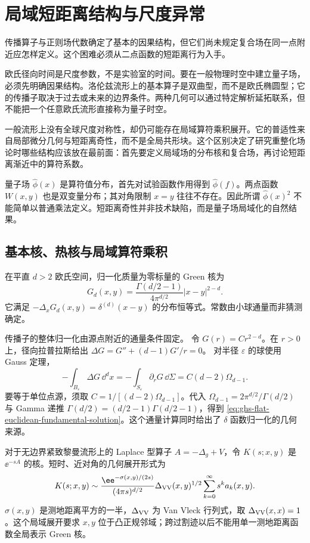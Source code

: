 \section{局域短距离结构与尺度异常}

传播算子与正则场代数确定了基本的因果结构，但它们尚未规定复合场在同一点附近应怎样定义。这个困难必须从二点函数的短距离行为入手。


欧氏径向时间是尺度参数，不是实验室的时间。要在一般物理时空中建立量子场，必须先明确因果结构。洛伦兹流形上的基本算子是双曲型，而不是欧氏椭圆型；它的传播子取决于过去或未来的边界条件。两种几何可以通过特定解析延拓联系，但不能把一个任意欧氏流形直接称为量子时空。


一般流形上没有全球尺度对称性，却仍可能存在局域算符乘积展开。它的普适性来自局部微分几何与短距离奇性，而不是全局共形块。这个区别决定了研究重整化场论时哪些结构应该放在最前面：首先要定义局域场的分布核和复合场，再讨论短距离渐近中的算符系数。


量子场 $\widehat\phi(x)$ 是算符值分布，首先对试验函数作用得到 $\widehat\phi(f)$。两点函数 $W(x,y)$ 也是双变量分布；其对角限制 $x=y$ 往往不存在。因此所谓 $\widehat\phi(x)^2$ 不能简单以普通乘法定义。短距离奇性并非技术缺陷，而是量子场局域化的自然结果。

\subsection{基本核、热核与局域算符乘积}

在平直 $d>2$ 欧氏空间，归一化质量为零标量的 Green 核为
\begin{equation}\label{eq:ghs-flat-euclidean-fundamental-solution}
 G_d(x,y)=\frac{\Gamma(d/2-1)}{4\pi^{d/2}}
 |x-y|^{2-d}.
\end{equation}
它满足 $-\Delta_xG_d(x,y)=\delta^{(d)}(x-y)$ 的分布恒等式。常数由小球通量而非猜测确定。


传播子的整体归一化由源点附近的通量条件固定。
令 $G(r)=Cr^{2-d}$。在 $r>0$ 上，径向拉普拉斯给出
$\Delta G=G''+(d-1)G'/r=0$。
对半径 $\varepsilon$ 的球使用 Gauss 定理，
\[
 -\int_{B_\varepsilon}\Delta G\,\dd^dx
 =-\int_{S_\varepsilon}\partial_rG\,\dd\Sigma
 =C(d-2)\Omega_{d-1}.
\]
要等于单位点源，须取 $C=1/[(d-2)\Omega_{d-1}]$。代入 $\Omega_{d-1}=2\pi^{d/2}/\Gamma(d/2)$ 与 Gamma 递推 $\Gamma(d/2)=(d/2-1)\Gamma(d/2-1)$，得到 \cref{eq:ghs-flat-euclidean-fundamental-solution}。这个通量计算同时给出了 $\delta$ 函数归一化的几何来源。


对于无边界紧致黎曼流形上的 Laplace 型算子 $A=-\Delta_g+V$，令 $K(s;x,y)$ 是 $\ee^{-sA}$ 的核。短时、近对角的几何展开形式为
\begin{equation}\label{eq:ghs-heat-kernel-parametrix}
 K(s;x,y)\sim\frac{\ee^{-\sigma(x,y)/(2s)}}{(4\pi s)^{d/2}}
 \Delta_{\rm VV}(x,y)^{1/2}\sum_{k=0}^\infty s^ka_k(x,y).
\end{equation}
$\sigma(x,y)$ 是测地距离平方的一半，$\Delta_{\rm VV}$ 为 Van Vleck 行列式，取 $\Delta_{\rm VV}(x,x)=1$。这个局域展开要求 $x,y$ 位于凸正规邻域；跨过割迹以后不能用单一测地距离函数全局表示 Green 核。

